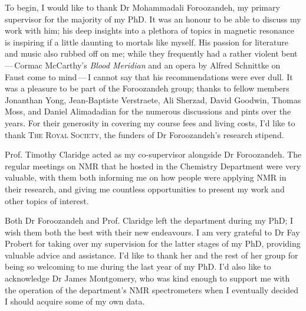 \begin{acknowledgements}
    To begin, I would like to thank Dr Mohammadali Foroozandeh, my primary
    supervisor for the majority of my PhD. It was an honour to be able to
    discuss my work with him; his deep insights into a plethora of
    topics in magnetic resonance is inspiring if a little daunting to
    mortals like myself.
    His passion for literature and music also rubbed off on me; while they
    frequently had a rather violent bent\,---\,Cormac McCarthy's \emph{Blood
    Meridian} and an opera by Alfred Schnittke on Faust come to mind\,---\,I
    cannot say that his recommendations were ever dull.
    It was a pleasure to be part of the Foroozandeh group; thanks to fellow
    members Jonanthan Yong, Jean-Baptiste Verstraete, Ali Sherzad, David
    Goodwin, Thomas Moss, and Daniel Alimadadian for the numerous discussions
    and pints over the years.
    For their generosity in covering my course fees and living costs, I'd like
    to thank \textsc{The Royal Society}, the funders of Dr Foroozandeh's research
    stipend.

    Prof. Timothy Claridge acted as my co-supervisor alongside Dr Foroozandeh.
    The regular meetings on NMR that he hosted in the Chemistry Department were
    very valuable, with them both informing me on how people were
    applying NMR in their research, and giving me countless opportunities to
    present my work and other topics of interest.

    Both Dr Foroozandeh and Prof. Claridge left the department during my PhD;
    I wish them both the best with their new endeavours.
    I am very grateful to Dr Fay Probert for taking over my supervision for the
    latter stages of my PhD, providing valuable advice and assistance.
    I'd like to thank her and the rest of her group for being so welcoming to
    me during the last year of my PhD. I'd also like to acknowledge Dr James
    Montgomery, who was kind enough to support me with the
    operation of the department's NMR spectrometers when I eventually decided
    I should acquire some of my own data.


\end{acknowledgements}
